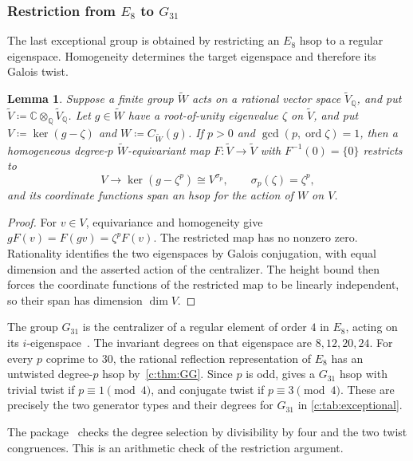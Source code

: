 \documentclass[10pt,a4paper]{amsart}
\newcommand{\defeq}{\coloneqq}
\newtheorem{lemma}[theorem]{Lemma}
\theoremstyle{definition}
\newcommand{\C}{\mathbb C}\newcommand{\Q}{\mathbb Q}
\begin{document}
\subsubsection{Restriction from \texorpdfstring{$E_8$ to $G_{31}$}{E8 to G31}}\label{c:sec:eigenspace}

The last exceptional group is obtained by restricting an $E_8$ hsop
to a regular eigenspace. Homogeneity determines the target eigenspace
and therefore its Galois twist.

\begin{lemma}\label{c:lem:eigenspace}
Suppose a finite group $\widetilde W$ acts on a rational vector space
$\widetilde V_{\Q}$, and put
$\widetilde V\defeq\C\otimes_{\Q}\widetilde V_{\Q}$.
Let $g\in\widetilde W$ have a root-of-unity eigenvalue $\zeta$ on
$\widetilde V$, and put $V\defeq\ker(g-\zeta)$ and
$W\defeq C_{\widetilde W}(g)$. If $p>0$ and
$\gcd(p,\operatorname{ord}\zeta)=1$, then a homogeneous degree-$p$
$\widetilde W$-equivariant map $F:\widetilde V\to\widetilde V$
with $F^{-1}(0)=\{0\}$ restricts to
\[
 V\longrightarrow \ker(g-\zeta^p)\cong V^{\sigma_p},
 \qquad \sigma_p(\zeta)=\zeta^p,
\]
and its coordinate functions span an hsop for the action of $W$ on $V$.
\end{lemma}

\begin{proof}
For $v\in V$, equivariance and homogeneity give
$gF(v)=F(gv)=\zeta^pF(v)$. The restricted map has no nonzero zero.
Rationality identifies the two eigenspaces by Galois conjugation, with
equal dimension and the asserted action of the centralizer.
The height bound then forces the coordinate functions of the restricted
map to be linearly independent, so their span has dimension $\dim V$.
\end{proof}

The group $G_{31}$ is the centralizer of a regular element of order $4$
in $E_8$, acting on its $i$-eigenspace~\cite[Theorem~1.9(2) and Example~1.10]{Bessis}.
The invariant degrees on that eigenspace are $8,12,20,24$. For every
$p$ coprime to $30$, the rational reflection representation of $E_8$
has an untwisted degree-$p$ hsop by~\cref{c:thm:GG}. Since $p$ is odd,
 gives a $G_{31}$ hsop with trivial twist
if $p\equiv1\pmod4$, and conjugate twist if $p\equiv3\pmod4$.
These are precisely the two generator types and their degrees for
$G_{31}$ in \cref{c:tab:exceptional}.

The package~\cite{Computations} checks the degree selection by
divisibility by four and the two twist congruences. This is an
arithmetic check of the restriction argument.
\end{document}
